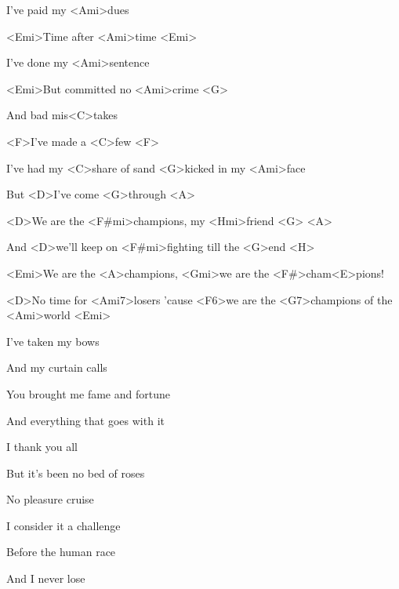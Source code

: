 

\zs
I've paid my <Ami>dues

<Emi>Time after <Ami>time <Emi>

I've done my <Ami>sentence

<Emi>But committed no <Ami>crime <G>

And bad mis<C>takes

<F>I've made a <C>few <F>

I've had my <C>share of sand <G>kicked in my <Ami>face

But <D>I've come <G>through <A>
\ks

\zr
<D>We are the <F#mi>champions, my <Hmi>friend <G> <A>

And <D>we'll keep on <F#mi>fighting till the <G>end <H>

<Emi>We are the <A>champions, <Gmi>we are the <F#>cham<E>pions!

<D>No time for <Ami7>losers 'cause <F6>we are the <G7>champions of the <Ami>world <Emi>
\kr

\zs
I've taken my bows

And my curtain calls

You brought me fame and fortune

And everything that goes with it

I thank you all

But it's been no bed of roses

No pleasure cruise

I consider it a challenge

Before the human race

And I never lose
\ks

\zr \kr

\kp
